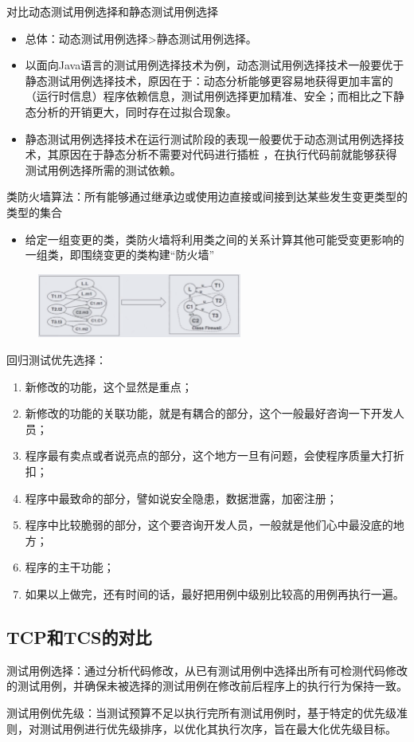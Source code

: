 对比动态测试用例选择和静态测试用例选择
\begin{itemize}
    \item 总体：动态测试用例选择>静态测试用例选择。
    \item 以面向Java语言的测试用例选择技术为例，动态测试用例选择技术一般要优于静态测试用例选择技术，原因在于：动态分析能够更容易地获得更加丰富的（运行时信息）程序依赖信息，测试用例选择更加精准、安全；而相比之下静态分析的开销更大，同时存在过拟合现象。
    \item 静态测试用例选择技术在运行测试阶段的表现一般要优于动态测试用例选择技术，其原因在于静态分析不需要对代码进行插桩 ，在执行代码前就能够获得测试用例选择所需的测试依赖。
\end{itemize}

类防火墙算法：所有能够通过继承边或使用边直接或间接到达某些发生变更类型的类型的集合
\begin{itemize}
    \item 给定一组变更的类，类防火墙将利用类之间的关系计算其他可能受变更影响的一组类，即围绕变更的类构建“防火墙”
\end{itemize}
\begin{figure}[H]
    \vspace{-0.5em}
	\centering
	\includegraphics[width=0.6\textwidth]{images/类防火墙.png}
    \vspace{-1em}
\end{figure}

回归测试优先选择：
\begin{enumerate}[label=\arabic*.]
    \item 新修改的功能，这个显然是重点；
    \item 新修改的功能的关联功能，就是有耦合的部分，这个一般最好咨询一下开发人员；
    \item 程序最有卖点或者说亮点的部分，这个地方一旦有问题，会使程序质量大打折扣；
    \item 程序中最致命的部分，譬如说安全隐患，数据泄露，加密注册；
    \item 程序中比较脆弱的部分，这个要咨询开发人员，一般就是他们心中最没底的地方；
    \item 程序的主干功能；
    \item 如果以上做完，还有时间的话，最好把用例中级别比较高的用例再执行一遍。
\end{enumerate}

\subsection{TCP和TCS的对比}
测试用例选择：通过分析代码修改，从已有测试用例中选择出所有可检测代码修改的测试用例，并确保未被选择的测试用例在修改前后程序上的执行行为保持一致。

测试用例优先级：当测试预算不足以执行完所有测试用例时，基于特定的优先级准则，对测试用例进行优先级排序，以优化其执行次序，旨在最大化优先级目标。

